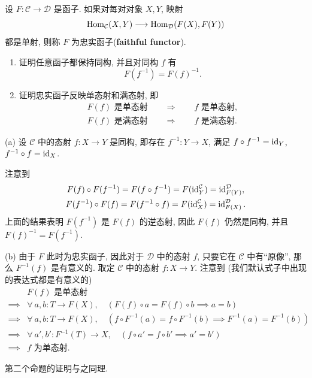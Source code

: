 \documentclass{article}
\begin{document}
\begin{problem}
  设 $F:\mathcal C\to\mathcal D$ 是函子. 如果对每对对象 $X,Y$, 映射
  \[
    \operatorname{Hom}_{\mathcal C}(X,Y)\longrightarrow
    \operatorname{Hom}_{\mathcal D}(F(X),F(Y))
  \]
  都是单射, 则称 $F$ 为{\heiti 忠实函子}(\textbf{faithful functor}).

  \begin{enumerate}
    \item[(a)] 证明任意函子都保持同构, 并且对同构 $f$ 有
      \[
        F(f^{-1})=F(f)^{-1}.
      \]

    \item[(b)] 证明忠实函子反映单态射和满态射, 即
			\begin{gather*}
        F(f)\text{ 是单态射}\qquad\Longrightarrow\qquad f\text{ 是单态射},\\
        F(f)\text{ 是满态射}\qquad\Longrightarrow\qquad f\text{ 是满态射}.
			\end{gather*}
  \end{enumerate}
\end{problem}

\begin{solution}
	(a) 设 $\mathcal{C}$ 中的态射 $f: X\to Y$ 是同构, 即存在 $f^{-1}: Y\to X$, 满足 $f \circ f^{-1} = \operatorname{id}_Y$, $f^{-1} \circ f = \operatorname{id}_X$.

	注意到
	\begin{gather*}
		F(f) \circ F(f^{-1}) = F(f \circ f^{-1}) = F(\operatorname{id}_Y^{\mathcal{C}}) = \operatorname{id}_{F(Y)}^{\mathcal{D}}, \\
		F(f^{-1}) \circ F(f) = F(f^{-1} \circ f) = F(\operatorname{id}_X^{\mathcal{C}}) = \operatorname{id}_{F(X)}^{\mathcal{D}}.
	\end{gather*}
	上面的结果表明 $F(f^{-1})$ 是 $F(f)$ 的逆态射, 因此 $F(f)$ 仍然是同构, 并且 $F(f)^{-1} = F(f^{-1})$.

	(b) 由于 $F$ 此时为忠实函子, 因此对于 $\mathcal{D}$ 中的态射 $f$, 只要它在 $\mathcal{C}$ 中有``原像'', 那么 $F^{-1}(f)$ 是有意义的. 取定 $\mathcal{C}$ 中的态射 $f:X\to Y$. 注意到 (我们默认式子中出现的表达式都是有意义的) 
	\[ \begin{array}{cc}
		 & F(f) \text{ 是单态射} \\
		\implies & \forall\ a,b: T\to F(X), \quad 
		(F(f) \circ a = F(f) \circ b \implies a = b) \\
		\implies & \forall\ a,b: T\to F(X), \quad 
		(f \circ F^{-1}(a) = f \circ F^{-1}(b) \implies F^{-1}(a) = F^{-1}(b)) \\
		\implies & \forall\ a',b': F^{-1}(T)\to X, \quad 
		(f \circ a' = f \circ b' \implies a' = b') \\
		\implies & f \text{ 为单态射}.
	\end{array} \]

	第二个命题的证明与之同理.
\end{solution}
\end{document}
